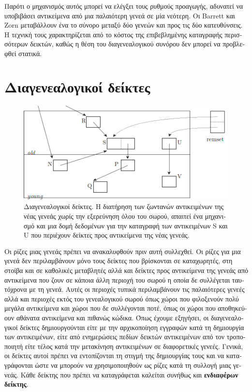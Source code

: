 \begin{greek}
Παρότι ο μηχανισμός αυτός μπορεί να ελέγξει τους ρυθμούς
προαγωγής, αδυνατεί να υποβιβάσει αντικείμενα από μια παλαιότερη
γενεά σε μία νεότερη. Οι Barrett και Zorn \cite{DBLP:conf/pldi/BarrettZ95}
μεταβάλλουν ένα το σύνορο μεταξύ δύο γενεών και προς τις δύο
κατευθύνσεις. Η τεχνική τους χαρακτηρίζεται από το κόστος
της επιβεβλημένης καταγραφής περισσότερων δεικτών, καθώς η
θέση του διαγενεαλογικού συνόρου δεν μπορεί να προβλεφθεί στατικά.

\section{Διαγενεαλογικοί δείκτες}
\begin{figure}
  \centering
  \includegraphics{figures/gen_1}
  \caption[Διαγενεαλογικοί δείκτες]
    {Διαγενεαλογικοί δείκτες. Η διατήρηση των ζωντανών αντικειμένων
     της νέας γενεάς χωρίς την εξερεύνηση όλου του σωρού, απαιτεί
     ένα μηχανισμό και μια δομή δεδομένων για την καταγραφή των
     αντικειμένων S και U που περιέχουν δείκτες προς αντικείμενα
     της νέας γενεάς.}
  \label{fig:gen_1} 
\end{figure}

Οι ρίζες μιας γενεάς πρέπει να ανακαλυφθούν πριν αυτή συλλεχθεί.
Οι ρίζες για μια γενεά δεν περιλαμβάνουν μόνο τους δείκτες που
βρίσκονται σε καταχωρητές, στη στοίβα και σε καθολικές μεταβλητές
αλλά και δείκτες προς αντικείμενα της γενεάς από αντικείμενα
που ζουν σε κάποια άλλη περιοχή του σωρού η οποία δε συλλέγεται
ταυτόχρονα με τη γενεά. Αυτές οι περιοχές τυπικά περιλαμβάνουν
τις παλαιότερες γενεές αλλά και περιοχές εκτός του γενεαλογικού
σωρού όπως χώροι που φιλοξενούν πολύ μεγάλα αντικείμενα και
χώροι που δε συλλέγονται ποτέ, όπως οι χώροι που αποθηκεύουν
αθάνατα αντικείμενα και πιθανώς κώδικα. Όπως έχουμε εξηγήσει,
οι διαγενεαλογικοί δείκτες δημιουργούνται είτε με την αρχικοποίηση
εγγραφών κατά τη δημιουργία των αντικειμένων, είτε από ενημερώσεις
πεδίων δεικτών αντικειμένων από τον τροποποιητή είτε τέλος κατά
την μετακίνηση αντικειμένων σε διαφορετικές γενεές. Γενικά, οι
δείκτες αυτοί πρέπει να εντοπίζονται τη στιγμή της δημιουργίας
τους και να καταγράφονται ώστε να μπορούν να χρησιμοποιηθούν
ως ρίζες κατά τη συλλογή μιας γενεάς. Κάθε δείκτης που πρέπει
να καταγράφεται καλείται συνήθως και \textbf{ενδιαφέρων δείκτης}.


\end{greek}
